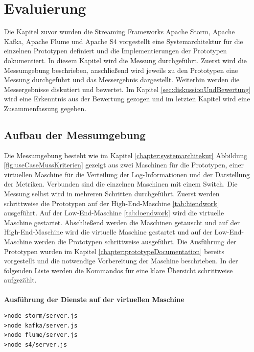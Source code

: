 \chapter{Evaluierung}
\label{chapter:evaluierung}

Die Kapitel zuvor wurden die Streaming Frameworks Apache Storm, Apache Kafka, Apache Flume und Apache S4 vorgestellt eine Systemarchitektur für die einzelnen Prototypen definiert und die Implementierungen der Prototypen dokumentiert. In diesem Kapitel wird die Messung durchgeführt. Zuerst wird die Messumgebung beschrieben, anschließend wird jeweils zu den Prototypen eine Messung durchgeführt und das Messergebnis dargestellt. Weiterhin werden die Messergebnisse diskutiert und bewertet. Im Kapitel \ref{sec:diskussionUndBewertung} wird eine Erkenntnis aus der Bewertung gezogen und im letzten Kapitel wird eine Zusammenfassung gegeben.

\section{Aufbau der Messumgebung}
\label{sec:aufbauMessumgebung}

Die Messumgebung besteht wie im Kapitel \ref{chapter:systemarchitekur} Abbildung \ref{fig:useCaseMussKriterien} gezeigt aus zwei Maschinen für die Prototypen, einer virtuellen Maschine für die Verteilung der Log-Informationen und der Darstellung der Metriken. Verbunden sind die einzelnen Maschinen mit einem Switch. Die Messung selbst wird in mehreren Schritten durchgeführt. Zuerst werden schrittweise die Prototypen auf der High-End-Maschine \ref{tab:hiendwork} ausgeführt. Auf der Low-End-Maschine \ref{tab:loendwork} wird die virtuelle Maschine gestartet. Abschließend werden die Maschinen getauscht und auf der High-End-Maschine wird die virtuelle Maschine gestartet und auf der Low-End-Maschine werden die Prototypen schrittweise ausgeführt. Die Ausführung der Prototypen wurden im Kapitel \ref{chapter:prototypeDocumentation} bereits vorgestellt und die notwendige Vorbereitung der Maschine beschrieben. In der folgenden Liste werden die Kommandos für eine klare Übersicht schrittweise aufgezählt. \\\\

\textbf{Ausführung der Dienste auf der virtuellen Maschine}

\begin{verbatim}
>node storm/server.js
>node kafka/server.js
>node flume/server.js
>node s4/server.js
\end{verbatim}



